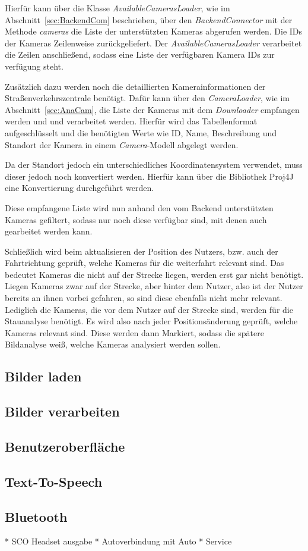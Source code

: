 Hierfür kann über die Klasse {\em AvailableCamerasLoader}, wie im Abschnitt~\ref{sec:BackendCom} beschrieben, über den {\em BackendConnector} mit der Methode {\em cameras} die Liste der unterstützten Kameras abgerufen werden.
Die IDs der Kameras Zeilenweise zurückgeliefert. Der {\em AvailableCamerasLoader} verarbeitet die Zeilen anschließend, sodass eine Liste der verfügbaren Kamera IDs zur verfügung steht.

Zusätzlich dazu werden noch die detaillierten Kamerainformationen der Straßenverkehrszentrale benötigt. Dafür kann über den {\em CameraLoader}, wie im Abschnitt~\ref{sec:AnaCam}, die Liste der Kameras mit dem {\em Downloader} empfangen werden und und verarbeitet werden. Hierfür wird das Tabellenformat aufgeschlüsselt und die benötigten Werte wie ID, Name, Beschreibung und Standort der Kamera in einem {\em Camera}-Modell abgelegt werden.

Da der Standort jedoch ein unterschiedliches Koordinatensystem verwendet, muss dieser jedoch noch konvertiert werden. Hierfür kann über die Bibliothek Proj4J~\cite{proj4j} eine Konvertierung durchgeführt werden.

Diese empfangene Liste wird nun anhand den vom Backend unterstützten Kameras gefiltert, sodass nur noch diese verfügbar sind, mit denen auch gearbeitet werden kann.

Schließlich wird beim aktualisieren der Position des Nutzers, bzw. auch der Fahrtrichtung geprüft, welche Kameras für die weiterfahrt relevant sind. Das bedeutet Kameras die nicht auf der Strecke liegen, werden erst gar nicht benötigt. Liegen Kameras zwar auf der Strecke, aber hinter dem Nutzer, also ist der Nutzer bereits an ihnen vorbei gefahren, so sind diese ebenfalls nicht mehr relevant. Lediglich die Kameras, die vor dem Nutzer auf der Strecke sind, werden für die Stauanalyse benötigt. 
Es wird also nach jeder Positionsänderung geprüft, welche Kameras relevant sind. Diese werden dann Markiert, sodass die spätere Bildanalyse weiß, welche Kameras analysiert werden sollen.

\subsection{Bilder laden}
\subsection{Bilder verarbeiten}
\subsection{Benutzeroberfläche}
\subsection{Text-To-Speech}
\subsection{Bluetooth}
* SCO Headset ausgabe
* Autoverbindung mit Auto
* Service 